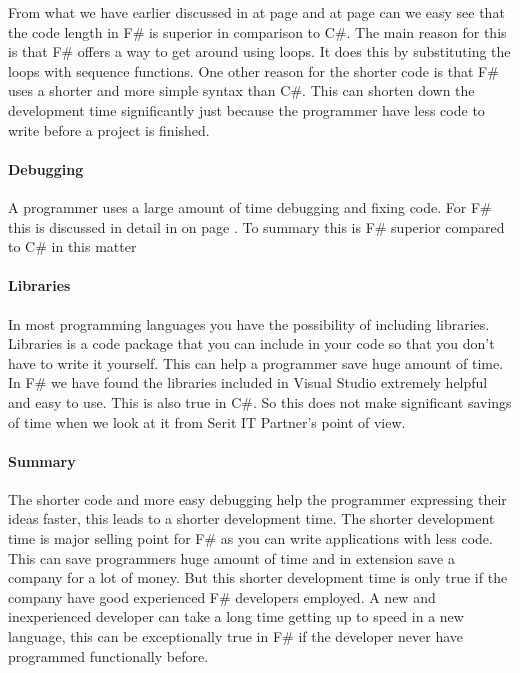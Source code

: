 \documentclass[12pt, a4paper]{article}
\begin{document}
From what we have earlier discussed in  at page \pageref{linesOfCode} and  at page \pageref{Testimonials} can we easy see that the code length in F\# is superior in comparison to C\#. The main reason for this is that F\# offers a way to get around using loops. It does this by substituting the loops with sequence functions. One other reason for the shorter code is that F\# uses a shorter and more simple syntax than C\#. This can shorten down the development time significantly just because the programmer have less code to write before a project is finished. 

\paragraph{Debugging}

A programmer uses a large amount of time debugging and fixing code. For F\# this is discussed in detail in  on page \pageref{debug}. To summary this is F\# superior compared to C\# in this matter

\paragraph{Libraries}

In most programming languages you have the possibility of including libraries. Libraries is a code package that you can include in your code so that you don't have to write it yourself. This can help a programmer save huge amount of time.\\

In F\# we have found the libraries included in Visual Studio extremely helpful and easy to use. This is also true in C\#. So this does not make significant savings of time when we look at it from Serit IT Partner's point of view.

\paragraph{Summary}
The shorter code and more easy debugging help the programmer expressing their ideas faster, this leads to a shorter development time. The shorter development time is major selling point for F\# as you can write applications with less code. This can save programmers huge amount of time and in extension save a company for a lot of money. But this shorter development time is only true if the company have good experienced F\# developers employed. A new and inexperienced developer can take a long time getting up to speed in a new language, this can be exceptionally true in F\# if the developer never have programmed functionally before.   
\end{document}
